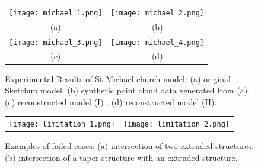 \begin{figure} [htbp]
\begin{center}
\begin{tabular}{cc}
\texttt{[image: michael\_1.png]} &
\texttt{[image: michael\_2.png]} \\
(a) & (b) \\
\texttt{[image: michael\_3.png]} &
\texttt{[image: michael\_4.png]} \\
(c) & (d)
\end{tabular}
\end{center}
\caption{Experimental Results of St Michael church model:
      (a) original Sketchup model.
      (b) synthetic point cloud data generated from (a).
      (c) reconstructed model (I) .
      (d) reconstructed model (II).}
\label{fig:ER_Fig10}
\end{figure}

\begin{figure} [htbp]
\begin{center}
\begin{tabular}{cc}
\texttt{[image: limitation\_1.png]} &
\texttt{[image: limitation\_2.png]}
\end{tabular}
\end{center}
\caption{Examples of failed cases:
      (a) intersection of two extruded structures.
      (b) intersection of a taper structure with an extruded structure.}
\label{fig:ER_Lmt}
\end{figure}




